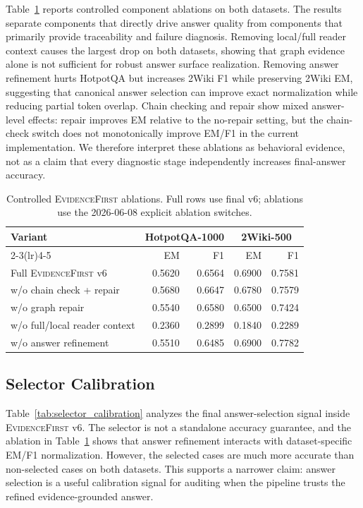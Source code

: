 \documentclass[runningheads]{llncs}
\newcommand{\sys}{\textsc{EvidenceFirst}\xspace}
\begin{document}
Table~\ref{tab:ablations} reports controlled component ablations on both
datasets. The results separate components that directly drive answer quality
from components that primarily provide traceability and failure diagnosis.
Removing local/full reader context causes the largest drop on both datasets,
showing that graph evidence alone is not sufficient for robust answer surface
realization. Removing answer refinement hurts HotpotQA but increases 2Wiki F1
while preserving 2Wiki EM, suggesting that canonical answer selection can
improve exact normalization while reducing partial token overlap. Chain checking
and repair show mixed answer-level effects: repair improves EM relative to the
no-repair setting, but the chain-check switch does not monotonically improve
EM/F1 in the current implementation. We therefore interpret these ablations as
behavioral evidence, not as a claim that every diagnostic stage independently
increases final-answer accuracy.

\begin{table}[t]
\centering
\caption{Controlled \sys ablations. Full rows use final v6; ablations use the
2026-06-08 explicit ablation switches.}
\label{tab:ablations}
\small
\begin{tabular}{lrrrr}
\toprule
\multirow{2}{*}{Variant} & \multicolumn{2}{c}{HotpotQA-1000} & \multicolumn{2}{c}{2Wiki-500} \\
\cmidrule(lr){2-3}\cmidrule(lr){4-5}
 & EM & F1 & EM & F1 \\
\midrule
Full \sys v6 & 0.5620 & 0.6564 & 0.6900 & 0.7581 \\
w/o chain check + repair & 0.5680 & 0.6647 & 0.6780 & 0.7579 \\
w/o graph repair & 0.5540 & 0.6580 & 0.6500 & 0.7424 \\
w/o full/local reader context & 0.2360 & 0.2899 & 0.1840 & 0.2289 \\
w/o answer refinement & 0.5510 & 0.6485 & 0.6900 & 0.7782 \\
\bottomrule
\end{tabular}
\end{table}

\subsection{Selector Calibration}

Table~\ref{tab:selector_calibration} analyzes the final answer-selection signal
inside \sys v6. The selector is not a standalone accuracy guarantee, and the
ablation in Table~\ref{tab:ablations} shows that answer refinement interacts
with dataset-specific EM/F1 normalization. However, the selected cases are much
more accurate than non-selected cases on both datasets. This supports a narrower
claim: answer selection is a useful calibration signal for auditing when the
pipeline trusts the refined evidence-grounded answer.
\end{document}
